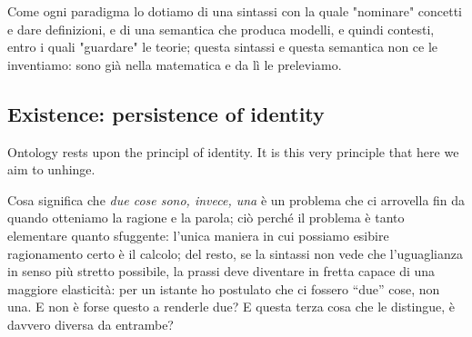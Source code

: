 \documentclass{amsart}
\begin{document}
Come ogni paradigma lo dotiamo di una sintassi con la quale "nominare" concetti e dare definizioni, e di una semantica che produca modelli, e quindi contesti, entro i quali "guardare" le teorie; questa sintassi e questa semantica non ce le inventiamo: sono già nella matematica e da lì le preleviamo.
\subsection{Existence: persistence of identity}
Ontology rests upon the principl of identity. It is this very principle that here we aim to unhinge.

Cosa significa che \emph{due cose sono, invece, una} è un problema che ci arrovella fin da quando otteniamo la ragione e la parola; ciò perché il problema è tanto elementare quanto sfuggente: l'unica maniera in cui possiamo esibire ragionamento certo è il calcolo; del resto, se la sintassi non vede che l'uguaglianza in senso più stretto possibile, la prassi deve diventare in fretta capace di una maggiore elasticità: per un istante ho postulato che ci fossero ``due'' cose, non una. E non è forse questo a renderle due? E questa terza cosa che le distingue, è davvero diversa da entrambe?
\end{document}
